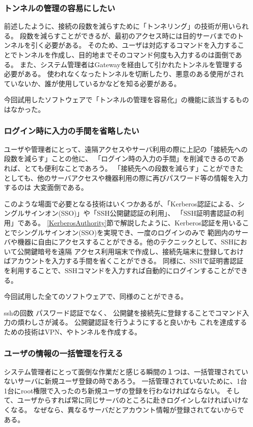 \documentclass[11pt,a4j,titlepage]{jreport}
\begin{document}
\subsubsection*{トンネルの管理の容易にしたい}
前述したように、接続の段数を減らすために「トンネリング」の技術が用いられる。
段数を減らすことができるが、最初のアクセス時には目的サーバまでのトンネルを引く必要がある。
そのため、ユーザは対応するコマンドを入力することでトンネルを作成し、目的地までそのコマンド何度も入力するのは面倒である。
また、システム管理者はGatewayを経由して引かれたトンネルを管理する必要がある。
使われなくなったトンネルを切断したり、悪意のある使用がされていないか、誰が使用しているかなどを知る必要がある。

今回試用したソフトウェアで「トンネルの管理を容易化」の機能に該当するものはなかった。


\subsubsection*{ログイン時に入力の手間を省略したい}
ユーザや管理者にとって、遠隔アクセスやサーバ利用の際に上記の「接続先への段数を減らす」ことの他に、
「ログイン時の入力の手間」を削減できるのであれば、とても便利なことであろう。
「接続先への段数を減らす」ことができたとしても、他のサーバアクセスや機器利用の際に再びパスワード等の情報を入力するのは
大変面倒である。

このような場面で必要となる技術はいくつかあるが、「Kerberos認証による、シングルサインオン(SSO)」や「SSH公開鍵認証の利用」、
「SSH証明書認証の利用」である。
\ref{KerberosAuthority}節で解説したように、Kerberos認証を用いることでシングルサインオン(SSO)を実現でき、一度のログインのみで
範囲内のサーバや機器に自由にアクセスすることができる。他のテクニックとして、SSHにおいて公開鍵暗号を遠隔
アクセス利用端末で作成し、接続先端末に登録しておけばアカウントを入力する手間を省くことができる。
同様に、SSHで証明書認証を利用することで、SSHコマンドを入力すれば自動的にログインすることができる。
\par 今回試用した全てのソフトウェアで、同様のことができる。

sshの回数
パスワード認証でなく、
公開鍵を接続先に登録することでコマンド入力の煩わしさが減る。
公開鍵認証を行うようにすると良いかも
これを達成するための技術はVPN、やトンネルを作成する。
\fi

\subsubsection{ユーザの情報の一括管理を行える}
システム管理者にとって面倒な作業だと感じる瞬間の１つは、一括管理されていないサーバに新規ユーザ登録の時であろう。
一括管理されていないために、1台1台にroot権限で入ったのち新規ユーザの登録を行わなければならない。
そして、ユーザからすれば常に同じサーバのところに赴きログインしなければいけなくなる。
なぜなら、異なるサーバだとアカウント情報が登録されてないからである。
\end{document}
